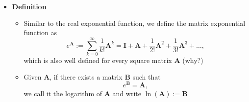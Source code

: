\documentclass[12pt,a4paper]{article}
\begin{document}
\begin{itemize}
\item \textbf{Definition}
  \begin{itemize}
  \item Similar to the real exponential function, we define the matrix exponential function as
    \begin{equation}\nonumber%
      e^{\bm{A}} := 
      \sum_{k=0}^{\infty} \frac{1}{k!}\bm{A}^{k}
      = \bm{I} + \bm{A} + \frac{1}{2!}\bm{A}^{2} + \frac{1}{3!}\bm{A}^{3} + \ldots,
    \end{equation}
    which is also well defined for every square matrix $\bm{A}$ (why?)
  \item Given $\bm{A}$, if there exists a matrix $\bm{B}$ such that
    \begin{equation}\nonumber%
      e^{\bm{B}} = \bm{A},
    \end{equation}
    we call it the logarithm of $\bm{A}$ and write $\ln(\bm{A}):=\bm{B}$
  \end{itemize}


\end{itemize}
\end{document}
